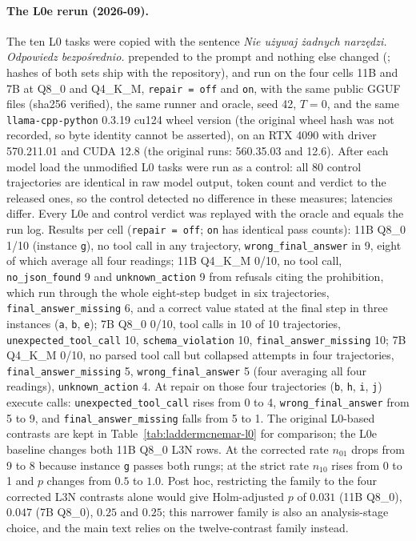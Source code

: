 \documentclass[11pt]{article}
\begin{document}
\paragraph{The L0e rerun (2026-09).} The ten L0 tasks were copied with the sentence \emph{Nie używaj żadnych narzędzi. Odpowiedz bezpośrednio.} prepended to the prompt and nothing else changed (; hashes of both sets ship with the repository), and run on the four cells 11B and 7B at Q8\_0 and Q4\_K\_M, \texttt{repair\,=\,off} and \texttt{on}, with the same public GGUF files (sha256 verified), the same runner and oracle, seed 42, $T=0$, and the same \texttt{llama-cpp-python} 0.3.19 cu124 wheel version (the original wheel hash was not recorded, so byte identity cannot be asserted), on an RTX 4090 with driver 570.211.01 and CUDA 12.8 (the original runs: 560.35.03 and 12.6). After each model load the unmodified L0 tasks were run as a control: all 80 control trajectories are identical in raw model output, token count and verdict to the released ones, so the control detected no difference in these measures; latencies differ. Every L0e and control verdict was replayed with the oracle and equals the run log. Results per cell (\texttt{repair\,=\,off}; \texttt{on} has identical pass counts): 11B Q8\_0 1/10 (instance \texttt{g}), no tool call in any trajectory, \texttt{wrong\_final\_answer} in 9, eight of which average all four readings; 11B Q4\_K\_M 0/10, no tool call, \texttt{no\_json\_found} 9 and \texttt{unknown\_action} 9 from refusals citing the prohibition, which run through the whole eight-step budget in six trajectories, \texttt{final\_answer\_missing} 6, and a correct value stated at the final step in three instances (\texttt{a}, \texttt{b}, \texttt{e}); 7B Q8\_0 0/10, tool calls in 10 of 10 trajectories, \texttt{unexpected\_tool\_call} 10, \texttt{schema\_violation} 10, \texttt{final\_answer\_missing} 10; 7B Q4\_K\_M 0/10, no parsed tool call but collapsed attempts in four trajectories, \texttt{final\_answer\_missing} 5, \texttt{wrong\_final\_answer} 5 (four averaging all four readings), \texttt{unknown\_action} 4. At repair on those four trajectories (\texttt{b}, \texttt{h}, \texttt{i}, \texttt{j}) execute calls: \texttt{unexpected\_tool\_call} rises from 0 to 4, \texttt{wrong\_final\_answer} from 5 to 9, and \texttt{final\_answer\_missing} falls from 5 to 1. The original L0-based contrasts are kept in Table~\ref{tab:laddermcnemar-l0} for comparison; the L0e baseline changes both 11B Q8\_0 L3N rows. At the corrected rate $n_{01}$ drops from 9 to 8 because instance \texttt{g} passes both rungs; at the strict rate $n_{10}$ rises from 0 to 1 and $p$ changes from $0.5$ to $1.0$. Post hoc, restricting the family to the four corrected L3N contrasts alone would give Holm-adjusted $p$ of $0.031$ (11B Q8\_0), $0.047$ (7B Q8\_0), $0.25$ and $0.25$; this narrower family is also an analysis-stage choice, and the main text relies on the twelve-contrast family instead.
\end{document}
